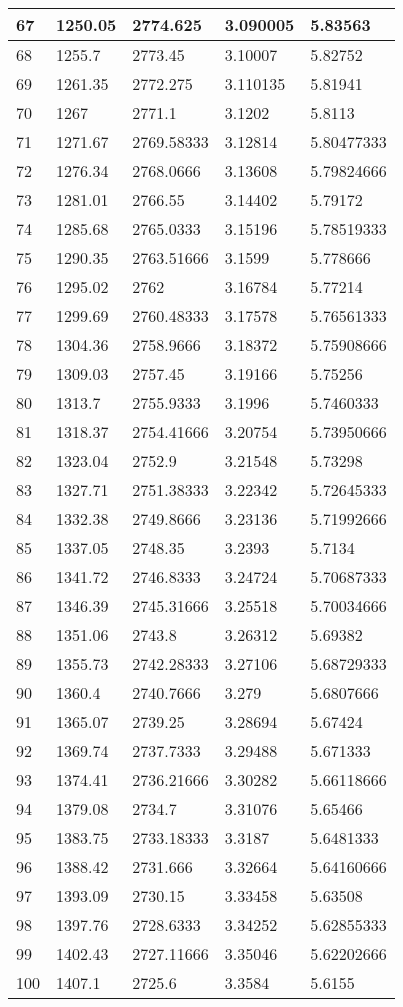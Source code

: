 \documentclass[twocolumn]{article}
\begin{document}
\begin{tabular}{l|l|l|l|l}
67	&	1250.05	&	2774.625	&	3.090005	&	5.83563 \\ \hline
68	&	1255.7	&	2773.45	&	3.10007	&	5.82752 \\ \hline
69	&	1261.35	&	2772.275	&	3.110135	&	5.81941 \\ \hline
70	&	1267	&	2771.1	&	3.1202	&	5.8113 \\ \hline
71	&	1271.67	&	2769.58333	&	3.12814	&	5.80477333 \\ \hline
72	&	1276.34	&	2768.0666	&	3.13608	&	5.79824666 \\ \hline
73	&	1281.01	&	2766.55	&	3.14402	&	5.79172 \\ \hline
74	&	1285.68	&	2765.0333	&	3.15196	&	5.78519333 \\ \hline
75	&	1290.35	&	2763.51666	&	3.1599	&	5.778666 \\ \hline
76	&	1295.02	&	2762	&	3.16784	&	5.77214 \\ \hline
77	&	1299.69	&	2760.48333	&	3.17578	&	5.76561333 \\ \hline
78	&	1304.36	&	2758.9666	&	3.18372	&	5.75908666 \\ \hline
79	&	1309.03	&	2757.45	&	3.19166	&	5.75256 \\ \hline
80	&	1313.7	&	2755.9333	&	3.1996	&	5.7460333 \\ \hline
81	&	1318.37	&	2754.41666	&	3.20754	&	5.73950666 \\ \hline
82	&	1323.04	&	2752.9	&	3.21548	&	5.73298 \\ \hline
83	&	1327.71	&	2751.38333	&	3.22342	&	5.72645333 \\ \hline
84	&	1332.38	&	2749.8666	&	3.23136	&	5.71992666 \\ \hline
85	&	1337.05	&	2748.35	&	3.2393	&	5.7134 \\ \hline
86	&	1341.72	&	2746.8333	&	3.24724	&	5.70687333 \\ \hline
87	&	1346.39	&	2745.31666	&	3.25518	&	5.70034666 \\ \hline
88	&	1351.06	&	2743.8	&	3.26312	&	5.69382 \\ \hline
89	&	1355.73	&	2742.28333	&	3.27106	&	5.68729333 \\ \hline
90	&	1360.4	&	2740.7666	&	3.279	&	5.6807666 \\ \hline
91	&	1365.07	&	2739.25	&	3.28694	&	5.67424 \\ \hline
92	&	1369.74	&	2737.7333	&	3.29488	&	5.671333 \\ \hline
93	&	1374.41	&	2736.21666	&	3.30282	&	5.66118666 \\ \hline
94	&	1379.08	&	2734.7	&	3.31076	&	5.65466 \\ \hline
95	&	1383.75	&	2733.18333	&	3.3187	&	5.6481333 \\ \hline
96	&	1388.42	&	2731.666	&	3.32664	&	5.64160666 \\ \hline
97	&	1393.09	&	2730.15	&	3.33458	&	5.63508 \\ \hline
98	&	1397.76	&	2728.6333	&	3.34252	&	5.62855333 \\ \hline
99	&	1402.43	&	2727.11666	&	3.35046	&	5.62202666 \\ \hline
100	&	1407.1	&	2725.6	&	3.3584	&	5.6155 \\ \hline
\end{tabular}
\end{document}
